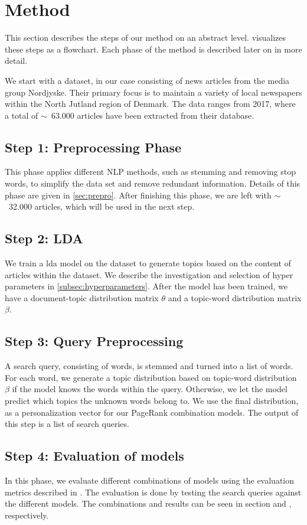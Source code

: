 \section{Method}\label{sec:method}
This section describes the steps of our method on an abstract level.
 visualizes these steps as a flowchart.
Each phase of the method is described later on in more detail. 

We start with a dataset, in our case consisting of news articles from the media group Nordjyske. 
Their primary focus is to maintain a variety of local newspapers within the North Jutland region of Denmark. 
The data ranges from 2017, where a total of $\sim$~63.000 articles have been extracted from their database.

\subsection*{Step 1: Preprocessing Phase}
This phase applies different \gls{NLP} methods, such as stemming and removing stop words, to simplify the data set and remove redundant information.
Details of this phase are given in \autoref{sec:prepro}.
After finishing this phase, we are left with $\sim$~32.000 articles, which will be used in the next step.

\subsection*{Step 2: LDA}
We train a \acrfull{lda} model on the dataset to generate topics based on the content of articles within the dataset. 
We describe the investigation and selection of hyper parameters in \autoref{subsec:hyperparameters}. 
After the model has been trained, we have a document-topic distribution matrix $\theta$ and a topic-word distribution matrix $\beta$.

\subsection*{Step 3: Query Preprocessing}
A search query, consisting of words, is stemmed and turned into a list of words.
For each word, we generate a topic distribution based on topic-word distribution $\beta$ if the model knows the words within the query.
Otherwise, we let the model predict which topics the unknown words belong to.
We use the final distribution, as a personalization vector for our PageRank combination models.
The output of this step is a list of search queries.


\subsection*{Step 4: Evaluation of models}
In this phase, we evaluate different combinations of models using the evaluation metrics described in .
The evaluation is done by testing the search queries against the different models. 
The combinations and results can be seen in section  and , respectively.



